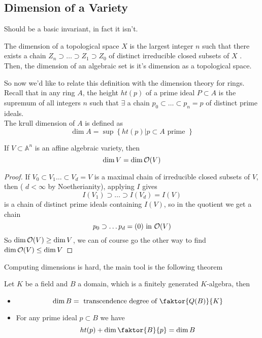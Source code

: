 \documentclass[../main.tex]{subfiles}
\begin{document}
\subsection{Dimension of a Variety}
Should be a basic invariant, in fact it isn't.
\begin{defn}
	The dimension of a topological space $X$ is the largest integer $n$ such that there exists a chain $Z_n \supset \ldots \supset Z_1 \supset Z_0$ of distinct irreducible closed subsets of $X$ .\\
	Then, the dimension of an algebraic set is it's dimension as a topological space.\\

\end{defn}
So now we'd like to relate this definition with the dimension theory for rings.\\
Recall that in any ring $A$, the height $ht( p) $ of a prime ideal $P \subset A$ is the supremum of all integers $n$ such that $ \exists$ a chain $ p_{0} \subset \ldots \subset p_n = p$ of distinct prime ideals.\\
The krull dimension of $A$ is defined as
\[ 
\dim A = \sup \left\{ ht( p) | p \subset A  \text{ prime } \right\} 
\]
\begin{propo}
If $V \subset \mathbb{A}^{n}$ is an affine algebraic variety, then
\[ 
\dim V = \dim \mathcal{O}( V) 
\]

\end{propo}
\begin{proof}
If $V_0 \subset V_1\ldots \subset V_d = V$ is a maximal chain of irreducible closed subsets of $V$, then ( $ d < \infty $ by Noetherianity), applying $I$ gives 
\[ 
I( V_1) \supset \ldots \supset I( V_d) = I( V) 
\]
is a chain of distinct prime ideals containing $I( V) $, so in the quotient we get a chain 
\[ 
p_0 \supset \ldots p_d = ( 0) \text{ in  } \mathcal{O}( V) 
\]
So $\dim \mathcal{O}( V) \geq \dim V$, we can of course go the other way to find $\dim \mathcal{O}( V)  \leq  \dim V$ 

\end{proof}
Computing dimensions is hard, the main tool is the following theorem
\begin{thm}
Let $K$ be a field and $B$ a domain, which is a finitely generated $K$-algebra, then
\begin{itemize}
\item 
	\[ 
	\dim B = \text{ transcendence degree of  } \faktor { Q( B) } { K} 
	\]
	
\item For any prime ideal $p \subset B $ we have
	\[ 
	ht( p)  + \dim \faktor { B} { p} = \dim B
	\]
	
\end{itemize}
\end{thm}
\end{document}
